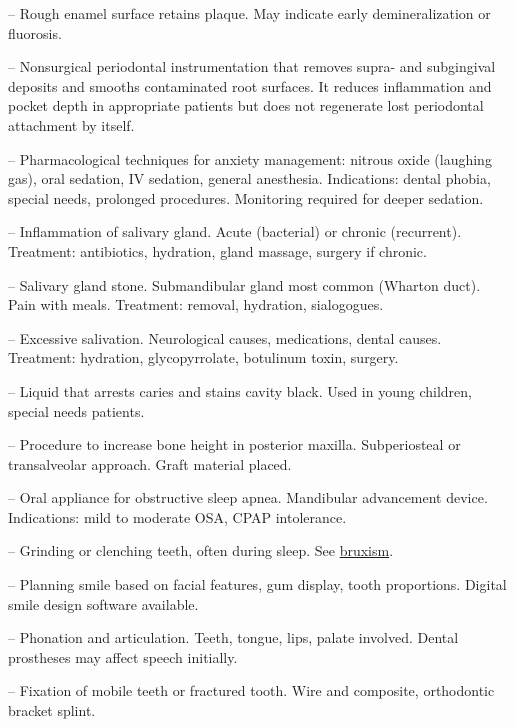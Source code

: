 -- Rough enamel surface retains plaque. May indicate early demineralization or fluorosis.

-- Nonsurgical periodontal instrumentation that removes supra- and subgingival deposits and smooths contaminated root surfaces. It reduces inflammation and pocket depth in appropriate patients but does not regenerate lost periodontal attachment by itself.

-- Pharmacological techniques for anxiety management: nitrous oxide (laughing gas), oral sedation, IV sedation, general anesthesia. Indications: dental phobia, special needs, prolonged procedures. Monitoring required for deeper sedation.

-- Inflammation of salivary gland. Acute (bacterial) or chronic (recurrent). Treatment: antibiotics, hydration, gland massage, surgery if chronic.

-- Salivary gland stone. Submandibular gland most common (Wharton duct). Pain with meals. Treatment: removal, hydration, sialogogues.

-- Excessive salivation. Neurological causes, medications, dental causes. Treatment: hydration, glycopyrrolate, botulinum toxin, surgery.

-- Liquid that arrests caries and stains cavity black. Used in young children, special needs patients.

-- Procedure to increase bone height in posterior maxilla. Subperiosteal or transalveolar approach. Graft material placed.

-- Oral appliance for obstructive sleep apnea. Mandibular advancement device. Indications: mild to moderate OSA, CPAP intolerance.

-- Grinding or clenching teeth, often during sleep. See \hyperlink{Bruxism}{bruxism}.

-- Planning smile based on facial features, gum display, tooth proportions. Digital smile design software available.

-- Phonation and articulation. Teeth, tongue, lips, palate involved. Dental prostheses may affect speech initially.

-- Fixation of mobile teeth or fractured tooth. Wire and composite, orthodontic bracket splint.

